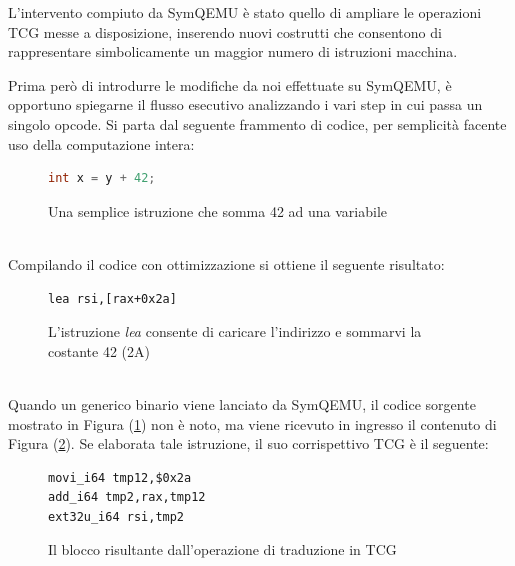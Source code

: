 \documentclass[Lau, oneside]{sapthesis}%
\begin{document}
\newline \newline
L'intervento compiuto da SymQEMU è stato quello di ampliare le operazioni TCG messe a disposizione, inserendo nuovi costrutti che consentono di rappresentare simbolicamente un maggior numero di istruzioni macchina.




\newpage
Prima però di introdurre le modifiche da noi effettuate su SymQEMU, è opportuno spiegarne il flusso esecutivo analizzando i vari step in cui passa un singolo opcode.
\newline \newline
Si parta dal seguente frammento di codice, per semplicità facente uso della computazione intera:
\begin{figure}[h]
\begin{lstlisting}[xleftmargin=.35\textwidth,language=C]
int x = y + 42;
\end{lstlisting}
  \caption{Una semplice istruzione che somma 42 ad una variabile}
  \label{fig:tcg_1}
\end{figure}
\ \\
\newline
Compilando il codice con ottimizzazione si ottiene il seguente risultato:
\begin{figure}[h]
  \begin{lstlisting}[xleftmargin=.35\textwidth,language={[x86masm]Assembler}]
lea rsi,[rax+0x2a]
\end{lstlisting}
  \caption{L'istruzione \textit{lea} consente di caricare l'indirizzo e sommarvi la costante 42 (2A)}
  \label{fig:tcg_2}
\end{figure}
\ \\
\newline
Quando un generico binario viene lanciato da SymQEMU, il codice sorgente mostrato in Figura (\ref{fig:tcg_1}) non è noto, ma viene ricevuto in ingresso il contenuto di Figura (\ref{fig:tcg_2}).
\newline
Se elaborata tale istruzione, il suo corrispettivo TCG è il seguente:
\begin{figure}[h]
\begin{lstlisting}[xleftmargin=.33\textwidth,language=SymQEMU]
movi_i64 tmp12,$0x2a
add_i64 tmp2,rax,tmp12
ext32u_i64 rsi,tmp2
\end{lstlisting}
\caption{Il blocco risultante dall'operazione di traduzione in TCG}
\label{fig:tcg_3}
\end{figure}
\ \\
\end{document}
